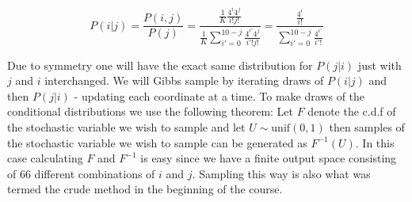 $$
P(i|j) = \frac{P(i,j)}{P(j)} = \frac{\frac{1}{K}\frac{4^i 4^j}{i!j!}}{\frac{1}{K}\sum_{i'=0}^{10-j}\frac{4^{i'} 4^j}{i'!j!}} = \frac{\frac{4^i}{i!}}{\sum_{i'=0}^{10-j}\frac{4^{i'}}{i'!}}
$$

Due to symmetry one will have the exact same distribution for $P(j|i)$ just with $j$ and $i$ interchanged. We will Gibbs sample by iterating draws of $P(i|j)$ and then $P(j|i)$ - updating each coordinate at a time. To make draws of the conditional distributions we use the following theorem: Let $F$ denote the c.d.f of the stochastic variable we wish to sample and let $U \sim \text{unif}(0,1)$ then samples of the stochastic variable we wish to sample can be generated as $F^{-1}(U)$. In this case calculating $F$ and $F^{-1}$ is easy since we have a finite output space consisting of $66$ different combinations of $i$ and $j$. Sampling this way is also what was termed the crude method in the beginning of the course. 

